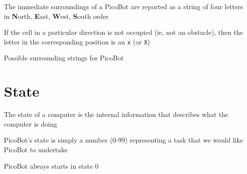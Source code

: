 \documentclass[8pt,a4paper,compress]{beamer}
\begin{document}
\begin{frame}[fragile]
\pause

The immediate surroundings of a PicoBot are reported as a string of four letters in \textbf{N}orth, \textbf{E}ast, \textbf{W}est, \textbf{S}outh order

\pause
\bigskip

If the cell in a particular direction is not occupied (ie, not an obstacle), then the letter in the corresponding position is an \lstinline{x} (or \lstinline{X})

\pause
\bigskip

Possible surrounding strings for PicoBot
\begin{center}
\end{center}
\end{frame}

\section{State}
\begin{frame}[fragile]
\pause

The state of a computer is the internal information that describes what the computer is doing

\pause
\bigskip

PicoBot's state is simply a number (0-99) representing a task that we would like PicoBot to undertake

\bigskip

\pause
PicoBot always starts in state 0
\end{frame}
\end{document}
